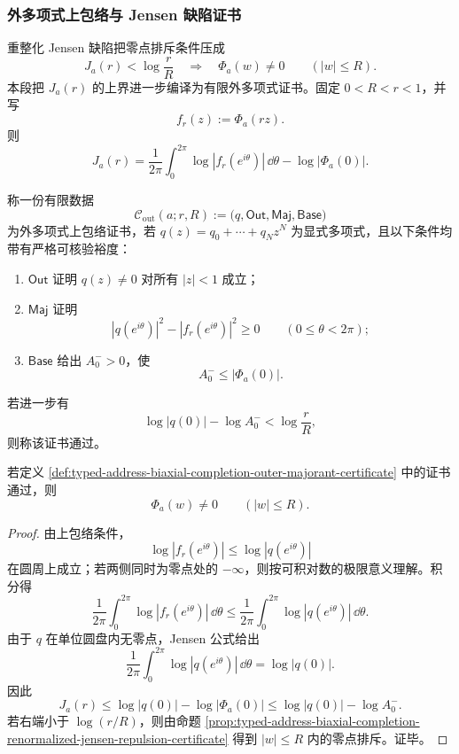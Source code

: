 \subsubsection{外多项式上包络与 Jensen 缺陷证书}\label{subsubsec:typed-address-biaxial-completion-outer-majorant-jensen-certificate}
重整化 Jensen 缺陷把零点排斥条件压成
\[
J_a(r)<\log\frac rR
\quad\Longrightarrow\quad
\Phi_a(w)\ne0\qquad(|w|\le R).
\]
本段把 \(J_a(r)\) 的上界进一步编译为有限外多项式证书。固定 \(0<R<r<1\)，并写
\[
f_r(z):=\Phi_a(rz).
\]
则
\[
J_a(r)=
\frac1{2\pi}\int_0^{2\pi}\log|f_r(e^{i\theta})|\,\dd\theta
-\log|\Phi_a(0)|.
\]

\begin{definition}[外多项式上包络证书]\label{def:typed-address-biaxial-completion-outer-majorant-certificate}
称一份有限数据
\[
\mathcal C_{\mathrm{out}}(a;r,R)
:=
\bigl(q,\mathsf{Out},\mathsf{Maj},\mathsf{Base}\bigr)
\]
为外多项式上包络证书，若 \(q(z)=q_0+\cdots+q_Nz^N\) 为显式多项式，且以下条件均带有严格可核验裕度：
\begin{enumerate}
  \item \(\mathsf{Out}\) 证明 \(q(z)\ne0\) 对所有 \(|z|<1\) 成立；
  \item \(\mathsf{Maj}\) 证明
  \[
  |q(e^{i\theta})|^2-|f_r(e^{i\theta})|^2\ge0
  \qquad(0\le\theta<2\pi);
  \]
  \item \(\mathsf{Base}\) 给出 \(A_0^->0\)，使
  \[
  A_0^-\le |\Phi_a(0)|.
  \]
\end{enumerate}
若进一步有
\[
\log|q(0)|-\log A_0^-<\log\frac rR,
\]
则称该证书通过。
\end{definition}

\begin{theorem}[外多项式上包络的零点排斥语义]\label{thm:typed-address-biaxial-completion-outer-majorant-repulsion}
若定义 \ref{def:typed-address-biaxial-completion-outer-majorant-certificate} 中的证书通过，则
\[
\Phi_a(w)\ne0\qquad(|w|\le R).
\]
\end{theorem}
\begin{proof}
由上包络条件，
\[
\log|f_r(e^{i\theta})|
\le
\log|q(e^{i\theta})|
\]
在圆周上成立；若两侧同时为零点处的 \(-\infty\)，则按可积对数的极限意义理解。积分得
\[
\frac1{2\pi}\int_0^{2\pi}\log|f_r(e^{i\theta})|\,\dd\theta
\le
\frac1{2\pi}\int_0^{2\pi}\log|q(e^{i\theta})|\,\dd\theta.
\]
由于 \(q\) 在单位圆盘内无零点，Jensen 公式给出
\[
\frac1{2\pi}\int_0^{2\pi}\log|q(e^{i\theta})|\,\dd\theta
=
\log|q(0)|.
\]
因此
\[
J_a(r)\le \log|q(0)|-\log|\Phi_a(0)|
\le
\log|q(0)|-\log A_0^-.
\]
若右端小于 \(\log(r/R)\)，则由命题 \ref{prop:typed-address-biaxial-completion-renormalized-jensen-repulsion-certificate} 得到 \(|w|\le R\) 内的零点排斥。证毕。
\end{proof}

